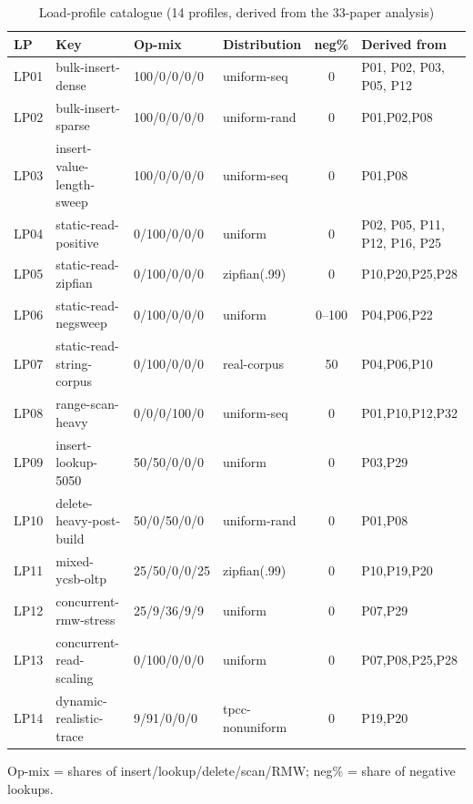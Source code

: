 \begin{nurlang}
\begin{table}[!htbp]
  \caption{Load-profile catalogue (14 profiles, derived from the 33-paper analysis)}\label{tab:lp-catalog}
  \centering\footnotesize
  \begin{tabular}{@{}l p{3.3cm} l l c p{2.4cm}@{}}
    \toprule
    \textbf{LP} & \textbf{Key} & \textbf{Op-mix} & \textbf{Distribution} & \textbf{neg\%} & \textbf{Derived from} \\
    \midrule
    LP01 & bulk-insert-dense & 100/0/0/0/0 & uniform-seq & 0 & P01, P02, P03, P05, P12 \\
    LP02 & bulk-insert-sparse & 100/0/0/0/0 & uniform-rand & 0 & P01,P02,P08 \\
    LP03 & insert-value-length-sweep & 100/0/0/0/0 & uniform-seq & 0 & P01,P08 \\
    LP04 & static-read-positive & 0/100/0/0/0 & uniform & 0 & P02, P05, P11, P12, P16, P25 \\
    LP05 & static-read-zipfian & 0/100/0/0/0 & zipfian(.99) & 0 & P10,P20,P25,P28 \\
    LP06 & static-read-negsweep & 0/100/0/0/0 & uniform & 0--100 & P04,P06,P22 \\
    LP07 & static-read-string-corpus & 0/100/0/0/0 & real-corpus & 50 & P04,P06,P10 \\
    LP08 & range-scan-heavy & 0/0/0/100/0 & uniform-seq & 0 & P01,P10,P12,P32 \\
    LP09 & insert-lookup-5050 & 50/50/0/0/0 & uniform & 0 & P03,P29 \\
    LP10 & delete-heavy-post-build & 50/0/50/0/0 & uniform-rand & 0 & P01,P08 \\
    LP11 & mixed-ycsb-oltp & 25/50/0/0/25 & zipfian(.99) & 0 & P10,P19,P20 \\
    LP12 & concurrent-rmw-stress & 25/9/36/9/9 & uniform & 0 & P07,P29 \\
    LP13 & concurrent-read-scaling & 0/100/0/0/0 & uniform & 0 & P07,P08,P25,P28 \\
    LP14 & dynamic-realistic-trace & 9/91/0/0/0 & tpcc-nonuniform & 0 & P19,P20 \\
    \bottomrule
  \end{tabular}

  \smallskip
  {\footnotesize Op-mix = shares of insert/lookup/delete/scan/RMW\@; neg\% = share of negative lookups.\par}
\end{table}
\end{nurlang}


